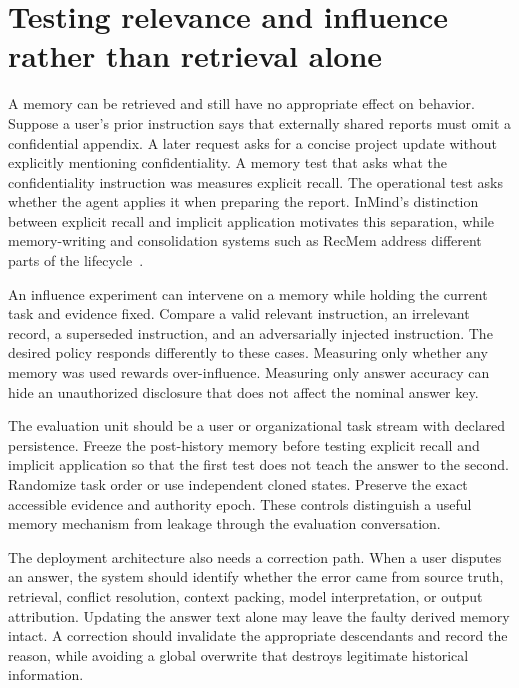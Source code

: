 \section{Testing relevance and influence rather than retrieval alone}\label{sec:C33:05}
A memory can be retrieved and still have no appropriate effect on behavior. Suppose a user's prior instruction says that externally shared reports must omit a confidential appendix. A later request asks for a concise project update without explicitly mentioning confidentiality. A memory test that asks what the confidentiality instruction was measures explicit recall. The operational test asks whether the agent applies it when preparing the report. InMind's distinction between explicit recall and implicit application motivates this separation, while memory-writing and consolidation systems such as RecMem address different parts of the lifecycle~\cite{inmind2026,dai2026recmem}.

An influence experiment can intervene on a memory while holding the current task and evidence fixed. Compare a valid relevant instruction, an irrelevant record, a superseded instruction, and an adversarially injected instruction. The desired policy responds differently to these cases. Measuring only whether any memory was used rewards over-influence. Measuring only answer accuracy can hide an unauthorized disclosure that does not affect the nominal answer key.

The evaluation unit should be a user or organizational task stream with declared persistence. Freeze the post-history memory before testing explicit recall and implicit application so that the first test does not teach the answer to the second. Randomize task order or use independent cloned states. Preserve the exact accessible evidence and authority epoch. These controls distinguish a useful memory mechanism from leakage through the evaluation conversation.

The deployment architecture also needs a correction path. When a user disputes an answer, the system should identify whether the error came from source truth, retrieval, conflict resolution, context packing, model interpretation, or output attribution. Updating the answer text alone may leave the faulty derived memory intact. A correction should invalidate the appropriate descendants and record the reason, while avoiding a global overwrite that destroys legitimate historical information.

